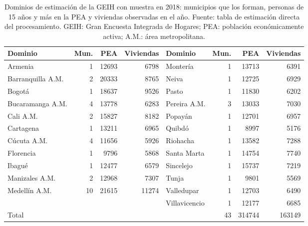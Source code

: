 \begin{table}[!htbp]
\centering
\small
\caption[Dominios de estimación de la GEIH con muestra en 2018]{Dominios de estimación de la GEIH con muestra en 2018: municipios que los forman, personas de 15 años y más en la PEA y viviendas observadas en el año. Fuente: tabla de estimación directa del procesamiento. GEIH: Gran Encuesta Integrada de Hogares; PEA: población económicamente activa; A.M.: área metropolitana.}
\label{tab:dominios_geih}
\renewcommand{\arraystretch}{1.1}
\begin{adjustbox}{max width=\linewidth}
\begin{tabular}{l r r r l r r r}
\toprule
Dominio & Mun. & PEA & Viviendas & Dominio & Mun. & PEA & Viviendas \\
\midrule
Armenia & 1 & \num{12693} & \num{6798} & Montería & 1 & \num{13713} & \num{6391} \\
Barranquilla A.M. & 2 & \num{20333} & \num{8765} & Neiva & 1 & \num{12725} & \num{6929} \\
Bogotá & 1 & \num{18637} & \num{9526} & Pasto & 1 & \num{11830} & \num{6202} \\
Bucaramanga A.M. & 4 & \num{13778} & \num{6283} & Pereira A.M. & 3 & \num{13033} & \num{7030} \\
Cali A.M. & 2 & \num{15827} & \num{8182} & Popayán & 1 & \num{12701} & \num{6957} \\
Cartagena & 1 & \num{13211} & \num{6965} & Quibdó & 1 & \num{8997} & \num{5176} \\
Cúcuta A.M. & 4 & \num{11656} & \num{5926} & Riohacha & 1 & \num{13582} & \num{7288} \\
Florencia & 1 & \num{9796} & \num{5868} & Santa Marta & 1 & \num{14754} & \num{7740} \\
Ibagué & 1 & \num{12477} & \num{6579} & Sincelejo & 1 & \num{15737} & \num{7219} \\
Manizales A.M. & 2 & \num{12968} & \num{7307} & Tunja & 1 & \num{9801} & \num{5569} \\
Medellín A.M. & 10 & \num{21615} & \num{11274} & Valledupar & 1 & \num{12703} & \num{6490} \\
 & & & & Villavicencio & 1 & \num{12177} & \num{6685} \\
\midrule
Total & & & & & 43 & \num{314744} & \num{163149} \\
\bottomrule
\end{tabular}
\end{adjustbox}
\end{table}

